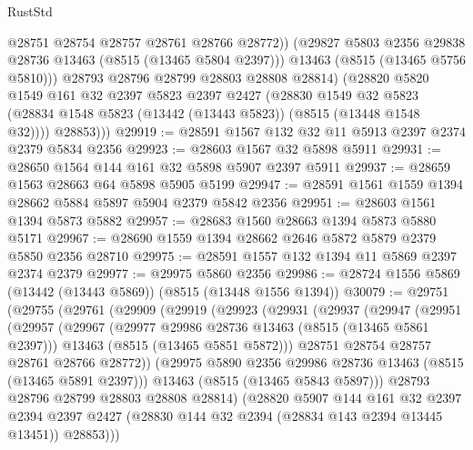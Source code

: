 \begin{lexlean}{RustStd}
\begin{coremodule}
                @28751
                @28754
                @28757
                @28761
                @28766
                @28772))
            (@29827 @5803 @2356 @29838 @28736 @13463 (@8515 (@13465 @5804 @2397)))
            @13463
            (@8515 (@13465 @5756 @5810)))
          @28793
          @28796
          @28799
          @28803
          @28808
          @28814)
        (@28820
          @5820
          @1549
          @161
          @32
          @2397
          @5823
          @2397
          @2427
          (@28830
            @1549
            @32
            @5823
            (@28834 @1548 @5823 (@13442 (@13443 @5823)) (@8515 (@13448 @1548 @32))))
          @28853)))
@29919 := @28591 @1567 @132 @32 @11 @5913 @2397 @2374 @2379 @5834 @2356
@29923 := @28603 @1567 @32 @5898 @5911
@29931 := @28650 @1564 @144 @161 @32 @5898 @5907 @2397 @5911
@29937 := @28659 @1563 @28663 @64 @5898 @5905 @5199
@29947 := @28591 @1561 @1559 @1394 @28662 @5884 @5897 @5904 @2379 @5842 @2356
@29951 := @28603 @1561 @1394 @5873 @5882
@29957 := @28683 @1560 @28663 @1394 @5873 @5880 @5171
@29967 := @28690 @1559 @1394 @28662 @2646 @5872 @5879 @2379 @5850 @2356 @28710
@29975 := @28591 @1557 @132 @1394 @11 @5869 @2397 @2374 @2379
@29977 := @29975 @5860 @2356
@29986 := @28724 @1556 @5869 (@13442 (@13443 @5869)) (@8515 (@13448 @1556 @1394))
@30079 := @29751
    (@29755
      (@29761
        (@29909
          (@29919
            (@29923
              (@29931
                (@29937
                  (@29947
                    (@29951
                      (@29957
                        (@29967
                          (@29977 @29986 @28736 @13463 (@8515 (@13465 @5861 @2397)))
                          @13463
                          (@8515 (@13465 @5851 @5872)))
                        @28751
                        @28754
                        @28757
                        @28761
                        @28766
                        @28772))
                    (@29975 @5890 @2356 @29986 @28736 @13463 (@8515 (@13465 @5891 @2397)))
                    @13463
                    (@8515 (@13465 @5843 @5897)))
                  @28793
                  @28796
                  @28799
                  @28803
                  @28808
                  @28814)
                (@28820
                  @5907
                  @144
                  @161
                  @32
                  @2397
                  @2394
                  @2397
                  @2427
                  (@28830 @144 @32 @2394 (@28834 @143 @2394 @13445 @13451))
                  @28853)))

\end{coremodule}
\end{lexlean}
